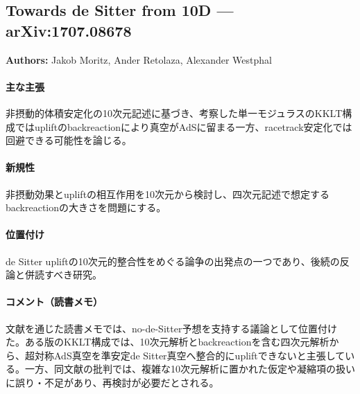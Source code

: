 \subsection{Towards de Sitter from 10D --- arXiv:1707.08678}

\textbf{Authors:} Jakob Moritz, Ander Retolaza, Alexander Westphal

\paragraph{主な主張}
非摂動的体積安定化の10次元記述に基づき、考察した単一モジュラスのKKLT構成ではupliftのbackreactionにより真空がAdSに留まる一方、racetrack安定化では回避できる可能性を論じる\cite{Moritz:2017xto}。

\paragraph{新規性}
非摂動効果とupliftの相互作用を10次元から検討し、四次元記述で想定するbackreactionの大きさを問題にする。

\paragraph{位置付け}
de Sitter upliftの10次元的整合性をめぐる論争の出発点の一つであり、後続の反論と併読すべき研究。

\paragraph{コメント（読書メモ）}
文献\cite{Kallosh:2019axr}を通じた読書メモでは、no-de-Sitter予想を支持する議論として位置付けた。ある版のKKLT構成では、10次元解析とbackreactionを含む四次元解析から、超対称AdS真空を準安定de Sitter真空へ整合的にupliftできないと主張している。一方、同文献の批判では、複雑な10次元解析に置かれた仮定や凝縮項の扱いに誤り・不足があり、再検討が必要だとされる。
